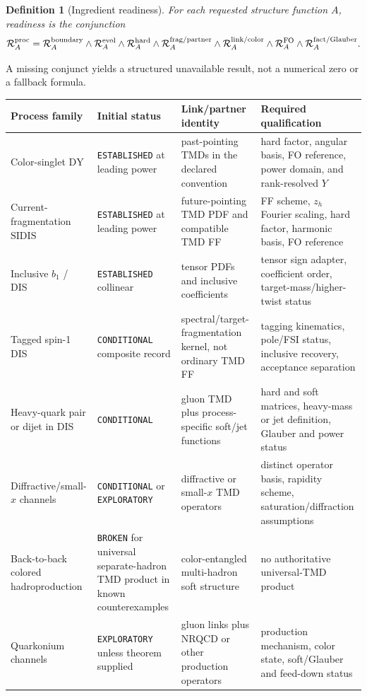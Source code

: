 \documentclass[11pt]{article}
\newtheorem{definition}{Definition}[section]
\newcommand{\DY}{\mathrm{DY}}
\newcommand{\SIDIS}{\mathrm{SIDIS}}
\newcommand{\cR}{\mathcal R}
\begin{document}
\begin{definition}[Ingredient readiness]
For each requested structure function \(A\), readiness is the conjunction
\begin{equation}
 \cR_A^{\rm proc}=
 \cR_A^{\rm boundary}
 \wedge\cR_A^{\rm evol}
 \wedge\cR_A^{\rm hard}
 \wedge\cR_A^{\rm frag/partner}
 \wedge\cR_A^{\rm link/color}
 \wedge\cR_A^{\rm FO}
 \wedge\cR_A^{\rm fact/Glauber}.
 \label{eq:readiness-conjunction}
\end{equation}
\end{definition}
A missing conjunct yields a structured unavailable result, not a numerical zero or a fallback formula.

\begin{longtable}{L{0.18\textwidth}L{0.16\textwidth}L{0.22\textwidth}L{0.30\textwidth}}
\toprule
Process family & Initial status & Link/partner identity & Required qualification\\
\midrule
\endhead
Color-singlet \(\DY\) & \texttt{ESTABLISHED} at leading power & past-pointing TMDs in the declared convention & hard factor, angular basis, FO reference, power domain, and rank-resolved \(Y\)\\
Current-fragmentation \(\SIDIS\) & \texttt{ESTABLISHED} at leading power & future-pointing TMD PDF and compatible TMD FF & FF scheme, \(z_h\) Fourier scaling, hard factor, harmonic basis, FO reference\\
Inclusive \(b_1\) / DIS & \texttt{ESTABLISHED} collinear & tensor PDFs and inclusive coefficients & tensor sign adapter, coefficient order, target-mass/higher-twist status\\
Tagged spin-1 DIS & \texttt{CONDITIONAL} composite record & spectral/target-fragmentation kernel, not ordinary TMD FF & tagging kinematics, pole/FSI status, inclusive recovery, acceptance separation\\
Heavy-quark pair or dijet in DIS & \texttt{CONDITIONAL} & gluon TMD plus process-specific soft/jet functions & hard and soft matrices, heavy-mass or jet definition, Glauber and power status\\
Diffractive/small-\(x\) channels & \texttt{CONDITIONAL} or \texttt{EXPLORATORY} & diffractive or small-\(x\) TMD operators & distinct operator basis, rapidity scheme, saturation/diffraction assumptions\\
Back-to-back colored hadroproduction & \texttt{BROKEN} for universal separate-hadron TMD product in known counterexamples & color-entangled multi-hadron soft structure & no authoritative universal-TMD product\\
Quarkonium channels & \texttt{EXPLORATORY} unless theorem supplied & gluon links plus NRQCD or other production operators & production mechanism, color state, soft/Glauber and feed-down status\\
\bottomrule
\end{longtable}
\end{document}
